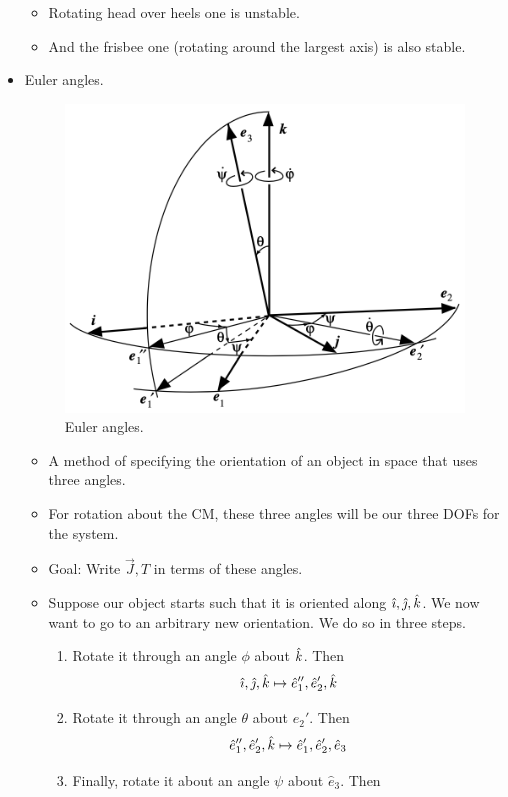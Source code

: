 \documentclass[../notes.tex]{subfiles}
\begin{document}
\begin{itemize}
\begin{itemize}
        \item Rotating head over heels one is unstable.
        \item And the frisbee one (rotating around the largest axis) is also stable.
    \end{itemize}
    \item Euler angles.
    \begin{figure}[h!]
        \centering
        \includegraphics[width=0.47\linewidth]{../ExtFiles/EulerAngles.png}
        \caption{Euler angles.}
        \label{fig:EulerAngles}
    \end{figure}
    \begin{itemize}
        \item A method of specifying the orientation of an object in space that uses three angles.
        \item For rotation about the CM, these three angles will be our three DOFs for the system.
        \item Goal: Write $\vec{J},T$ in terms of these angles.
        \item Suppose our object starts such that it is oriented along $\hat{\imath},\hat{\jmath},\hat{k}$. We now want to go to an arbitrary new orientation. We do so in three steps.
        \begin{enumerate}
            \item Rotate it through an angle $\phi$ about $\hat{k}$. Then
            \begin{equation*}
                \hat{\imath},\hat{\jmath},\hat{k} \mapsto \hat{e}_1'',\hat{e}_2',\hat{k}
            \end{equation*}
            \item Rotate it through an angle $\theta$ about $\hat{e}_2'$. Then
            \begin{equation*}
                \hat{e}_1'',\hat{e}_2',\hat{k} \mapsto \hat{e}_1',\hat{e}_2',\hat{e}_3
            \end{equation*}
            \item Finally, rotate it about an angle $\psi$ about $\hat{e}_3$. Then

\end{enumerate}
\end{itemize}
\end{itemize}
\end{document}
